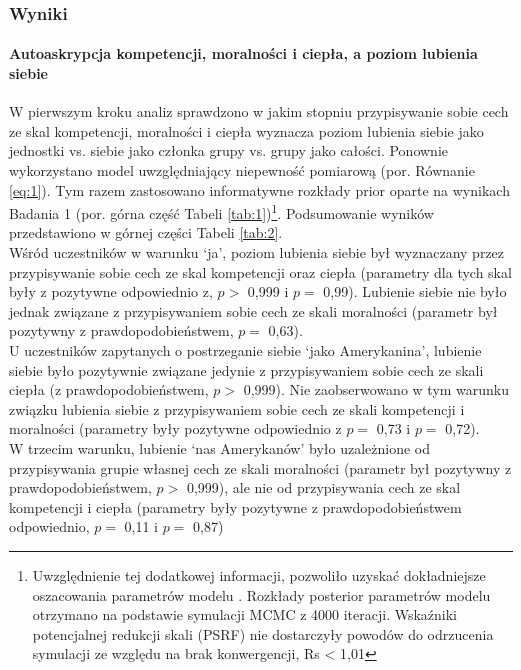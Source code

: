 \documentclass[man]{apa6}
\begin{document}
\subsubsection{Wyniki}

\paragraph{Autoaskrypcja kompetencji, moralności i ciepła, a poziom lubienia siebie}

W pierwszym kroku analiz sprawdzono w jakim stopniu przypisywanie sobie cech ze skal kompetencji, moralności i ciepła wyznacza poziom lubienia siebie jako jednostki vs. siebie jako członka grupy vs. grupy jako całości. Ponownie wykorzystano model uwzględniający niepewność pomiarową (por. Równanie \ref{eq:1}). Tym razem zastosowano informatywne rozkłady prior oparte na wynikach Badania 1 (por. górna część Tabeli \ref{tab:1})\footnote{Uwzględnienie tej dodatkowej informacji, pozwoliło uzyskać dokładniejsze oszacowania parametrów modelu \parencite[zob. np.][]{gill2014bayesian}. Rozkłady posterior parametrów modelu otrzymano na podstawie symulacji MCMC z 4000 iteracji. Wskaźniki potencjalnej redukcji skali (PSRF) nie dostarczyły powodów do odrzucenia symulacji ze względu na brak konwergencji, Rs < 1,01}. Podsumowanie wyników przedstawiono w górnej części Tabeli \ref{tab:2}. \\

Wśród uczestników w warunku `ja', poziom lubienia siebie był wyznaczany przez przypisywanie sobie cech ze skal kompetencji oraz ciepła (parametry dla tych skal były z pozytywne odpowiednio z, $p > $ 0,999 i $p = $ 0,99). Lubienie siebie nie było jednak związane z przypisywaniem sobie cech ze skali moralności (parametr był pozytywny z prawdopodobieństwem, $p = $ 0,63). \\

U uczestników zapytanych o postrzeganie siebie `jako Amerykanina', lubienie siebie było pozytywnie związane jedynie z przypisywaniem sobie cech ze skali ciepła (z prawdopodobieństwem, $p >$ 0,999). Nie zaobserwowano w tym warunku związku lubienia siebie z przypisywaniem sobie cech ze skali kompetencji i moralności (parametry były pozytywne odpowiednio z $p =$  0,73 i $p =$ 0,72).\\

W trzecim warunku, lubienie `nas Amerykanów' było uzależnione od przypisywania grupie własnej cech ze skali moralności (parametr był pozytywny z prawdopodobieństwem, $p >$ 0,999), ale nie od przypisywania cech ze skal kompetencji i ciepła (parametry były pozytywne z prawdopodobieństwem odpowiednio, $p =$ 0,11 i $p =$ 0,87)
\end{document}
